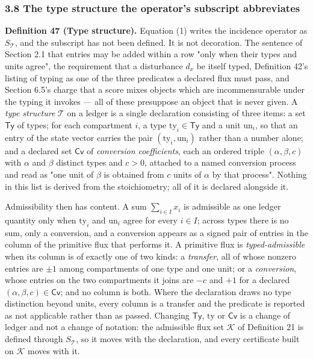 \documentclass[11pt]{article}
\begin{document}
\subsubsection{3.8 The type structure the operator's subscript abbreviates}\label{3-8-the-type-structure-the-operator-s-subscript-abbreviates}


\textbf{Definition 47 (Type structure).} Equation (1) writes the incidence operator as \(S_{\mathcal{T}}\), and the
subscript has not been defined. It is not decoration. The sentence of Section 2.1 that entries may be added
within a row "only when their types and units agree", the requirement that a disturbance \(d_x\) be itself typed,
Definition 42's listing of typing as one of the three predicates a declared flux must pass, and Section 6.5's
charge that a score mixes objects which are incommensurable under the typing it invokes --- all of these
presuppose an object that is never given. A \emph{type structure} \(\mathcal{T}\) on a ledger is a single declaration consisting of three
items: a set \(\mathsf{Ty}\) of types; for each compartment \(i\), a type \(\mathrm{ty}_i \in \mathsf{Ty}\) and a
unit \(\mathrm{un}_i\), so that an entry of the state vector carries the pair
\((\mathrm{ty}_i, \mathrm{un}_i)\) rather than a number alone; and a declared set \(\mathsf{Cv}\) of \emph{conversion
coefficients}, each an ordered triple \((\alpha, \beta, c)\) with \(\alpha\) and \(\beta\) distinct types and
\(c > 0\), attached to a named conversion process and read as "one unit of \(\beta\) is obtained from \(c\) units of
\(\alpha\) by that process". Nothing in this list is derived from the stoichiometry; all of it is declared
alongside it.

Admissibility then has content. A sum \(\sum_{i \in I} x_i\) is admissible as one ledger quantity only when
\(\mathrm{ty}_i\) and \(\mathrm{un}_i\) agree for every \(i \in I\); across types there is no sum, only a conversion,
and a conversion appears as a signed pair of entries in the column of the primitive flux that performs it. A
primitive flux is \emph{typed-admissible} when its column is of exactly one of two kinds: a \emph{transfer}, all of whose
nonzero entries are \(\pm 1\) among compartments of one type and one unit; or a \emph{conversion}, whose entries on
the two compartments it joins are \(-c\) and \(+1\) for a declared \((\alpha, \beta, c) \in \mathsf{Cv}\); and no
column is both. Where the declaration draws no type distinction beyond units, every column is a transfer and
the predicate is reported as not applicable rather than as passed. Changing \(\mathsf{Ty}\), \(\mathrm{ty}\) or
\(\mathsf{Cv}\) is a change of ledger and not a change of notation: the admissible flux set \(\mathcal{K}\) of
Definition 21 is defined through \(S_{\mathcal{T}}\), so it moves with the declaration, and every certificate
built on \(\mathcal{K}\) moves with it.
\end{document}
